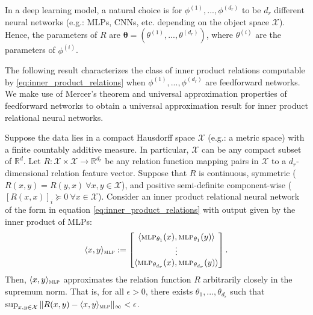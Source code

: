 In a deep learning model, a natural choice is for $\phi^{(1)}, ..., \phi^{(d_r)}$ to be $d_r$ different neural networks (e.g.: MLPs, CNNs, etc. depending on the object space $\mathcal{X}$). Hence, the parameters of $R$ are $\boldsymbol{\theta} = (\theta^{(1)}, ..., \theta^{(d_r)})$, where $\theta^{(i)}$ are the parameters of $\phi^{(i)}$.

The following result characterizes the class of inner product relations computable by \eqref{eq:inner_product_relations} when $\phi^{(1)}, ..., \phi^{(d_r)}$ are feedforward networks. We make use of Mercer's theorem and universal approximation properties of feedforward networks to obtain a universal approximation result for inner product relational neural networks.

\begin{thm}
	\label{thm:universal_approx_inner_product_relnn}
	\hphantom{~}

	Suppose the data lies in a compact Hausdorff space $\mathcal{X}$ (e.g.: a metric space) with a finite countably additive measure. In particular, $\mathcal{X}$ can be any compact subset of $\mathbb{R}^d$. Let $R: \mathcal{X} \times \mathcal{X} \to \mathbb{R}^{d_r}$ be any relation function mapping pairs in $\mathcal{X}$ to a $d_r$-dimensional relation feature vector. Suppose that $R$ is continuous, symmetric ($R(x,y) = R(y,x) \ \forall x,y \in \mathcal{X}$), and positive semi-definite component-wise ($[R(x,x)]_i \succeq 0 \ \forall x \in \mathcal{X}$). Consider an inner product relational neural network of the form in equation \eqref{eq:inner_product_relations} with output given by the inner product of MLPs:
	\begin{equation*}
		\langle x, y \rangle_{\MLP} := \begin{bmatrix}\langle \MLP_{\theta_1}(x), \MLP_{\theta_1}(y) \rangle \\ \vdots \\ \langle \MLP_{\theta_{d_r}}(x), \MLP_{\theta_{d_r}}(y) \rangle\end{bmatrix}.
	\end{equation*}
	Then, $\langle x, y \rangle_{\text{\sc mlp}}$ approximates the relation function $R$ arbitrarily closely in the supremum norm. That is, for all $\epsilon > 0$, there exists $\theta_1, ..., \theta_{d_r}$ such that $\sup_{x,y \in \mathcal{X}}{\lVert R(x,y) - \langle x, y \rangle_{\text{\sc mlp}} \rVert_\infty} < \epsilon$.
\end{thm}

